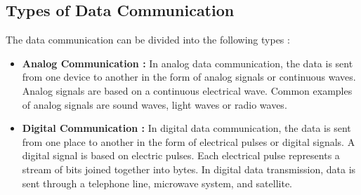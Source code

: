 \documentclass[12pt,a4paper]{article}%
\begin{document}
\begin{flushleft}
		\subsection{Types of Data Communication}
		\begin{flushleft}
			The data communication can be divided into the following types :
			\begin{itemize}
				\item \textbf{Analog Communication : } In analog data communication, the data is sent from one device to another in the form of analog signals or continuous waves. Analog signals are based on a continuous
				electrical wave. Common examples of analog signals are sound waves, light waves or radio waves.
				\item \textbf{Digital Communication : } In digital data communication, the data is sent from one place to another in the form of electrical pulses or digital signals. A digital signal is based on electric pulses. 
				Each electrical pulse represents a stream of bits joined together into bytes. In digital data transmission, data is sent through a telephone line, microwave system, and satellite.\\\bigskip
			\end{itemize}
		\end{flushleft}
		

\end{flushleft}
\end{document}
